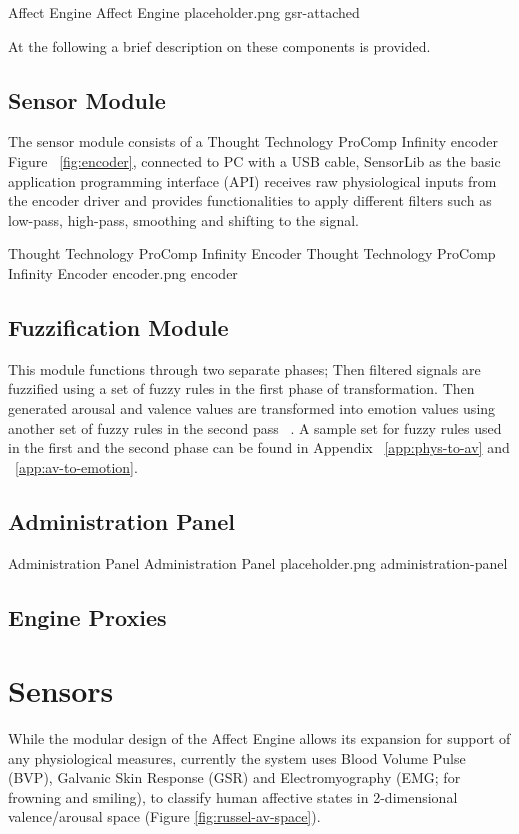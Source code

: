 \documentclass{uofsthesis-cs}
\begin{document}
\img
{Affect Engine}
{Affect Engine}
{placeholder.png}
{gsr-attached}

At the following a brief description on these components is provided.

\subsection{Sensor Module} %
The sensor module consists of a Thought Technology ProComp Infinity encoder ~\cite{tt2013procomp} Figure ~\ref{fig:encoder}, connected to PC with a USB cable, SensorLib as the basic application programming interface (API) receives raw physiological inputs from the encoder driver and provides functionalities to apply different filters such as low-pass, high-pass, smoothing and shifting to the signal.

\img
{Thought Technology ProComp Infinity Encoder}
{Thought Technology ProComp Infinity Encoder}
{encoder.png}
{encoder}

\subsection{Fuzzification Module} \label{subsec:fuzzi} %
This module functions through two separate phases; Then filtered signals are fuzzified using a set of fuzzy rules in the first phase of transformation. Then generated arousal and valence values are transformed into emotion values using another set of fuzzy rules in the second pass ~\cite{mandryk2007fuzzy}. A sample set for fuzzy rules used in the first and the second phase can be found in Appendix ~\ref{app:phys-to-av} and ~\ref{app:av-to-emotion}.



\subsection{Administration Panel}

\img
{Administration Panel}
{Administration Panel}
{placeholder.png}
{administration-panel}

\subsection{Engine Proxies}


\section{Sensors}
While the modular design of the Affect Engine allows its expansion for support of any physiological measures, currently the system uses Blood Volume Pulse (BVP), Galvanic Skin Response (GSR) and Electromyography (EMG; for frowning and smiling), to classify human affective states in 2-dimensional valence/arousal space (Figure \ref{fig:russel-av-space}).
\end{document}
